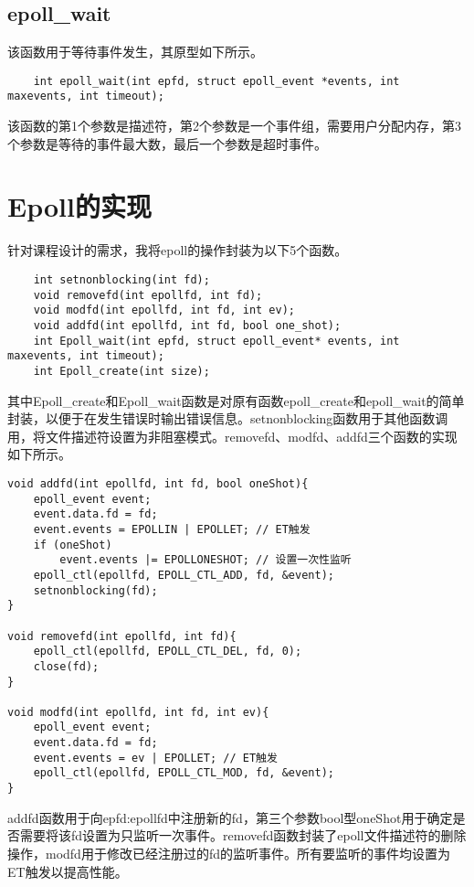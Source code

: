 \documentclass[bachelor]{thesis-uestc}
\begin{document}
\subsection{epoll\_wait}

该函数用于等待事件发生，其原型如下所示。

\begin{lstlisting}
	int epoll_wait(int epfd, struct epoll_event *events, int maxevents, int timeout);
\end{lstlisting}

该函数的第1个参数是描述符，第2个参数是一个事件组，需要用户分配内存，第3个参数是等待的事件最大数，最后一个参数是超时事件。

\section{Epoll的实现}

针对课程设计的需求，我将epoll的操作封装为以下5个函数。

\begin{lstlisting}
	int setnonblocking(int fd);
	void removefd(int epollfd, int fd);
	void modfd(int epollfd, int fd, int ev);
	void addfd(int epollfd, int fd, bool one_shot);
	int Epoll_wait(int epfd, struct epoll_event* events, int maxevents, int timeout);
	int Epoll_create(int size);
\end{lstlisting}

其中Epoll\_create和Epoll\_wait函数是对原有函数epoll\_create和epoll\_wait的简单封装，以便于在发生错误时输出错误信息。setnonblocking函数用于其他函数调用，将文件描述符设置为非阻塞模式。removefd、modfd、addfd三个函数的实现如下所示。
\begin{lstlisting}
void addfd(int epollfd, int fd, bool oneShot){
	epoll_event event;
	event.data.fd = fd;
	event.events = EPOLLIN | EPOLLET; // ET触发 
	if (oneShot)
		event.events |= EPOLLONESHOT; // 设置一次性监听 
	epoll_ctl(epollfd, EPOLL_CTL_ADD, fd, &event);
	setnonblocking(fd);
}

void removefd(int epollfd, int fd){
	epoll_ctl(epollfd, EPOLL_CTL_DEL, fd, 0);
	close(fd);
}

void modfd(int epollfd, int fd, int ev){
	epoll_event event;
	event.data.fd = fd;
	event.events = ev | EPOLLET; // ET触发 
	epoll_ctl(epollfd, EPOLL_CTL_MOD, fd, &event);
}
\end{lstlisting}

addfd函数用于向epfd:epollfd中注册新的fd，第三个参数bool型oneShot用于确定是否需要将该fd设置为只监听一次事件。removefd函数封装了epoll文件描述符的删除操作，modfd用于修改已经注册过的fd的监听事件。所有要监听的事件均设置为ET触发以提高性能。
\end{document}
